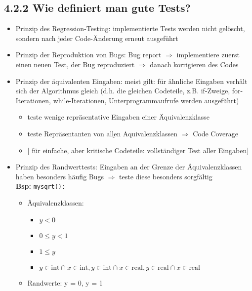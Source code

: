 \subsection*{4.2.2 Wie definiert man gute Tests?}
\begin{itemize}
    \item Prinzip des Regression-Testing: implementierte Tests werden nicht gelöscht, sondern nach jeder Code-Änderung erneut ausgeführt
    \item Prinzip der Reproduktion von Bugs: Bug report $\Rightarrow$ implementiere zuerst einen neuen Test, der Bug reproduziert $\Rightarrow$ danach korrigieren des Codes
    \item Prinzip der äquivalenten Eingaben: meist gilt: für ähnliche Eingaben verhält sich der Algorithmus gleich (d.h. die gleichen Codeteile, z.B. if-Zweige, for-Iterationen, while-Iterationen, Unterprogrammaufrufe werden ausgeführt)
    \begin{itemize}[label={$\Rightarrow$}]
        \item teste wenige repräsentative Eingaben einer Äquivalenzklasse
        \item teste Repräsentanten von $\underline{\text{allen}}$ Aquivalenzklassen $\Rightarrow$ Code Coverage
        \item[] $\lbrack$ für einfache, aber kritische Codeteile: vollständiger Test aller Eingaben$\rbrack$
    \end{itemize}
    \item Prinzip des Randwerttests: Eingaben an der Grenze der Äquivalenzklassen haben besonders häufig Bugs $\Rightarrow$ teste diese besonders sorgfältig \\
    \textbf{Bsp:} \verb|mysqrt(): |
    \begin{itemize}
        \item Äquivalenzklassen:
        \begin{itemize}
            \item $y < 0$
            \item $0 \leq y < 1$
            \item $1 \leq y$
            \item $y \in \text{int} \cap x \in \text{int}, y \in \text{int} \cap x \in \text{real}, y \in \text{real}\cap x \in \text{real}$
            \end{itemize}
            \item Randwerte: y = 0, y = 1
            \end{itemize}

\end{itemize}
